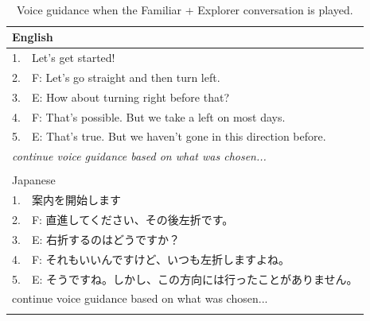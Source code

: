 \begin{table}[h]
\centering
\caption{Voice guidance when the Familiar + Explorer conversation is played.}~\label{tab:b-FE}
\begin{tabular}{ll}
\hline
\multicolumn{2}{l}{English}                                                                           \\ \hline
1.                      & Let's get started!                                                          \\ \hline
\multicolumn{1}{|l}{2.} & \multicolumn{1}{l|}{F: Let's go straight and then turn left.}               \\
\multicolumn{1}{|l}{3.} & \multicolumn{1}{l|}{E: How about turning right before that?}                \\
\multicolumn{1}{|l}{4.} & \multicolumn{1}{l|}{F: That's possible. But we take a left on most days.}   \\
\multicolumn{1}{|l}{5.} & \multicolumn{1}{l|}{E: That's true. But we haven't gone in this direction before.} \\ \hline
\multicolumn{2}{l}{\textit{continue voice guidance based on what was chosen...}}                      \\
                        &                                                                             \\ \hline
\multicolumn{2}{l}{Japanese}                                                                          \\ \hline
1.                      & 案内を開始します                                                                    \\ \hline
\multicolumn{1}{|l}{2.} & \multicolumn{1}{l|}{F: 直進してください、その後左折です。}                                   \\
\multicolumn{1}{|l}{3.} & \multicolumn{1}{l|}{E: 右折するのはどうですか？}                                        \\
\multicolumn{1}{|l}{4.} & \multicolumn{1}{l|}{F: それもいいんですけど、いつも左折しますよね。}                              \\
\multicolumn{1}{|l}{5.} & \multicolumn{1}{l|}{E: そうですね。しかし、この方向には行ったことがありません。}                        \\ \hline
\multicolumn{2}{l}{continue voice guidance based on what was chosen...}                               \\
                        &                                                                             \\ \hline

\end{tabular}
\end{table}
